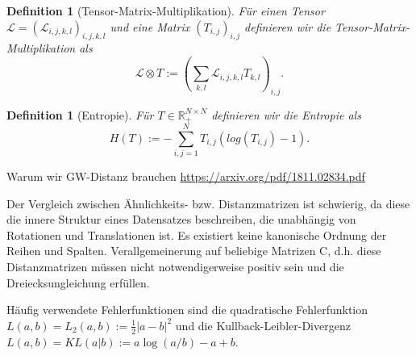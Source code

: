 \documentclass[11pt,a4paper]{article}
\newtheorem{definition}[theorem]{Definition}
\numberwithin{equation}{section}
\begin{document}

	\begin{definition}[Tensor-Matrix-Multiplikation]
		Für einen Tensor $\mathcal{L} = (\mathcal{L}_{i,j,k,l})_{i,j,k,l}$ und eine Matrix $(T_{i,j})_{i,j}$ definieren wir die Tensor-Matrix-Multiplikation als
		\begin{equation}
		\mathcal{L} \otimes T := \left(\sum_{k,l}{\mathcal{L}_{i,j,k,l}T_{k,l}}\right)_{i,j}. \label{eq:tensor_matrix_mul}
		\end{equation}
	\end{definition}
	
	\begin{definition}[Entropie]
		Für $T \in \mathbb{R}_{+}^{N \times N}$ definieren wir die Entropie als
		\begin{equation}
		H(T) := - \sum_{i,j=1}^N{T_{i,j}(log(T_{i,j})-1)}.
		\end{equation}
	\end{definition}
	
	Warum wir GW-Distanz brauchen
	\url{https://arxiv.org/pdf/1811.02834.pdf}
	
	Der Vergleich zwischen Ähnlichkeits- bzw. Distanzmatrizen ist schwierig, da diese die innere Struktur eines Datensatzes beschreiben, die unabhängig von Rotationen und Translationen ist. Es existiert keine kanonische Ordnung der Reihen und Spalten.
	Verallgemeinerung auf beliebige  Matrizen C, d.h. diese Distanzmatrizen müssen nicht notwendigerweise positiv sein und die Dreiecksungleichung erfüllen.
	

	
	\noindent Häufig verwendete Fehlerfunktionen sind die quadratische Fehlerfunktion $L(a,b) = L_2(a,b) := \frac{1}{2}|a-b|^2$ und die Kullback-Leibler-Divergenz $L(a,b)  = KL(a|b) := a\log(a/b) -a+b$.
	
\end{document}
